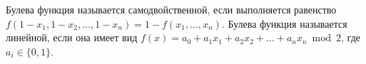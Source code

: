 Булева функция называется самодвойственной,	если выполняется равенство $f(1 - x_1, 1 - x_2, \dots, 1 - x_n) = 1 - f(x_1,
\dots, x_n)$. Булева функция называется линейной, если она имеет вид $f(x) = a_0 + a_1 x_1 + a_2 x_2 + \dots + a_nx_n \bmod
2$, где $a_i \in \{0, 1\}$.